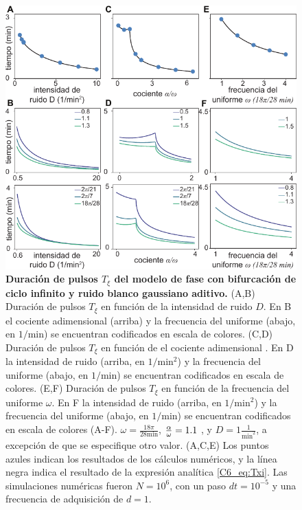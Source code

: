 \documentclass[./main.tex]{subfiles}
\begin{document}
\begin{figure}
    \centering
    \includegraphics[width=1\columnwidth]{figures/chapter6/C6_duration.pdf} 
    \caption{\textbf{Duración de pulsos $T_\xi$ del modelo de fase con bifurcación de ciclo infinito y ruido blanco gaussiano aditivo.} (A,B) Duración de pulsos $T_\xi$ en función de la intensidad de ruido $D$. En B el cociente adimensional \ddelta (arriba) y la frecuencia del uniforme (abajo, en $1/\text{min}$) se encuentran codificados en escala de colores. (C,D) Duración de pulsos $T_\xi$ en función de el cociente adimensional \ddelta. En D la intensidad de ruido (arriba, en $1/\text{min}^2$) y la frecuencia del uniforme (abajo, en $1/\text{min}$) se encuentran codificados en escala de colores. (E,F) Duración de pulsos $T_\xi$ en función de la frecuencia del uniforme $\omega$. En F la intensidad de ruido (arriba, en $1/\text{min}^2$) y la frecuencia del uniforme (abajo, en $1/\text{min}$) se encuentran codificados en escala de colores (A-F). $\omega = \frac{18\pi}{28 \text{min}}$, $\frac{\alpha}{\omega} = 1.1$ , y $D = 1 \frac{1}{\text{min}^2}$, a excepción de que se especifique otro valor. (A,C,E)  Los puntos azules indican los resultados de los cálculos numéricos, y la línea negra indica el resultado de la expresión analítica \ref{C6_eq:Txi}. Las simulaciones numéricas fueron $N=10^6$, con un paso $dt = 10^{-5}$ y una frecuencia de adquisición de $d=1$.}
    \label{C6_fig:duration}
\end{figure}
\end{document}
